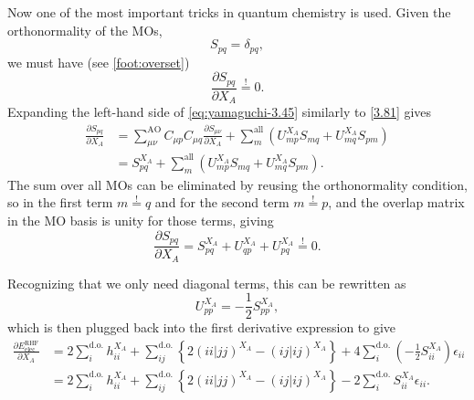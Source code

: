 \documentclass[%
class = book,%
crop = false,%
float = true,%
multi = true,%
preview = false,%
]{standalone}
\begin{document}
Now one of the most important tricks in quantum chemistry is used. Given the orthonormality of the MOs,
\begin{equation}
S_{pq} = \delta_{pq}, \tag{Yamaguchi eq. 3.44}
\end{equation}
we must have (see \autoref{foot:overset})
\begin{equation}
  \label{eq:yamaguchi-3.45}\tag{Yamaguchi eq. 3.45}
  \frac{\partial S_{pq}}{\partial X_{A}} \overset{!}{=} 0.
\end{equation}
Expanding the left-hand side of \eqref{eq:yamaguchi-3.45} similarly to \eqref{3.81} gives
\begin{align*}
\frac{\partial S_{pq}}{\partial X_{A}} &= \sum_{\mu\nu}^{\text{AO}} C_{\mu p} C_{\mu q} \frac{\partial S_{\mu\nu}}{\partial X_{A}} + \sum_{m}^{\text{all}} \left( U_{mp}^{X_{A}} S_{mq} + U_{mq}^{X_{A}} S_{pm} \right) \tag{Yamaguchi eqs. 3.40 + 3.43} \\
                                       &= S_{pq}^{X_{A}} + \sum_{m}^{\text{all}} \left( U_{mp}^{X_{A}} S_{mq} + U_{mq}^{X_{A}} S_{pm} \right). \tag{Yamaguchi eq. 3.43}
\end{align*}
The sum over all MOs can be eliminated by reusing the orthonormality condition, so in the first term \(m \overset{!}{=} q\) and for the second term \(m \overset{!}{=} p\), and the overlap matrix in the MO basis is unity for those terms, giving
\begin{equation}
  \label{eq:yamaguchi-3.46} \tag{Yamaguchi eq. 3.46}
  \frac{\partial S_{pq}}{\partial X_{A}} = S_{pq}^{X_{A}} + U_{qp}^{X_{A}} + U_{pq}^{X_{A}} \overset{!}{=} 0.
\end{equation}

Recognizing that we only need diagonal terms, this can be rewritten as
\begin{equation}
  \label{eq:yamaguchi-4.20} \tag{Yamaguchi eq. 4.20}
  U_{pp}^{X_{A}} = -\frac{1}{2} S_{pp}^{X_{A}},
\end{equation}
which is then plugged back into the first derivative expression to give
\begin{align*}
  \frac{\partial E_{\text{elec}}^{\text{RHF}}}{\partial X_{A}} &= 2 \sum_{i}^{\text{d.o.}} h_{ii}^{X_{A}} + \sum_{ij}^{\text{d.o.}} \left\{ 2(ii|jj)^{X_{A}} - (ij|ij)^{X_{A}} \right\} + 4 \sum_{i}^{\text{d.o.}} \left( -\frac{1}{2} S_{ii}^{X_{A}} \right) \epsilon_{ii} \\
                                                  &= 2 \sum_{i}^{\text{d.o.}} h_{ii}^{X_{A}} + \sum_{ij}^{\text{d.o.}} \left\{ 2(ii|jj)^{X_{A}} - (ij|ij)^{X_{A}} \right\} - 2 \sum_{i}^{\text{d.o.}} S_{ii}^{X_{A}} \epsilon_{ii}. \label{eq:yamaguchi-4.21-rederived}\tag{Yamaguchi eq. 4.21 [rederived]}
\end{align*}
\end{document}
